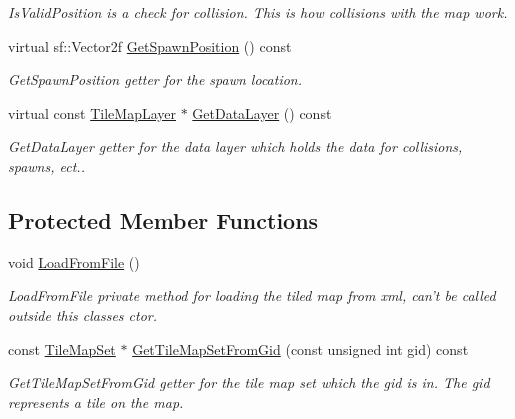 \begin{DoxyCompactItemize}
\begin{DoxyCompactList}\small\item\em Is\-Valid\-Position is a check for collision. This is how collisions with the map work. \end{DoxyCompactList}\item 
virtual sf\-::\-Vector2f \hyperlink{class_tile_map_a31c15d30a5d05e3667bd37d5e46c5b56}{Get\-Spawn\-Position} () const 
\begin{DoxyCompactList}\small\item\em Get\-Spawn\-Position getter for the spawn location. \end{DoxyCompactList}\item 
virtual const \hyperlink{class_tile_map_layer}{Tile\-Map\-Layer} $\ast$ \hyperlink{class_tile_map_a8b501e63e2e7040a41b65d489a77dfaf}{Get\-Data\-Layer} () const 
\begin{DoxyCompactList}\small\item\em Get\-Data\-Layer getter for the data layer which holds the data for collisions, spawns, ect.. \end{DoxyCompactList}\end{DoxyCompactItemize}
\subsection*{Protected Member Functions}
\begin{DoxyCompactItemize}
\item 
void \hyperlink{class_tile_map_a04a757f8848ecfb120324b1225b5622c}{Load\-From\-File} ()
\begin{DoxyCompactList}\small\item\em Load\-From\-File private method for loading the tiled map from xml, can't be called outside this classes ctor. \end{DoxyCompactList}\item 
const \hyperlink{class_tile_map_set}{Tile\-Map\-Set} $\ast$ \hyperlink{class_tile_map_a103bc4ec51b473b430bb859b1d5a215e}{Get\-Tile\-Map\-Set\-From\-Gid} (const unsigned int gid) const 
\begin{DoxyCompactList}\small\item\em Get\-Tile\-Map\-Set\-From\-Gid getter for the tile map set which the gid is in. The gid represents a tile on the map. \end{DoxyCompactList}\end{DoxyCompactItemize}
